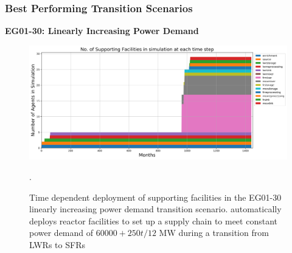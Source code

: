 \begin{frame}
    \frametitle{Best Performing Transition Scenarios}
    \textbf{EG01-30: Linearly Increasing Power Demand}
    \begin{figure}[htbp!]
        \begin{center}
          \includegraphics[width=\textwidth]{images/eg30-stack_support.png}
        \end{center}
              \caption{Time dependent deployment of supporting facilities in 
              the EG01-30 linearly increasing power demand transition scenario. 
              \deploy automatically deploys reactor facilities 
              to set up a supply chain to meet constant power demand of $60000+250t/12$ MW
              during a transition from \glspl{LWR} to \glspl{SFR}}.
      \end{figure}
\end{frame}

